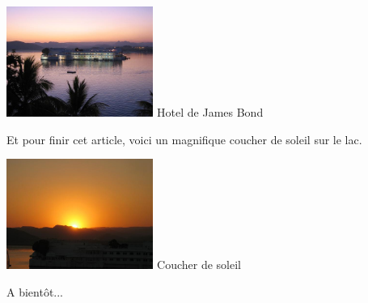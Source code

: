 \begin{multicols}{2}
\hspace*{-0.65cm}
\includegraphics[width=4.8cm]{articles/Octopussy/octopussy.jpg}
Hotel de James Bond

Et pour finir cet article, voici un magnifique coucher de soleil sur le lac.

\hspace*{-0.65cm}
\includegraphics[width=4.8cm]{articles/Octopussy/soleil.jpg}
Coucher de soleil

A bientôt...

\end{multicols}


